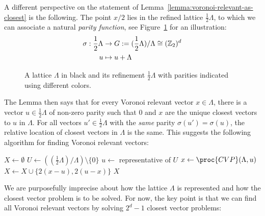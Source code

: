 A different perspective on the statement of Lemma~\ref{lemma:voronoi-relevant-as-closest}
is the following.
The point $x/2$ lies in the refined lattice $\frac{1}{2} \Lambda$,
to which we can associate a natural \emph{parity function},
see Figure~\ref{fig:lattice-refinement-parity} for an illustration:
\begin{align*}
  \sigma : \frac{1}{2} \Lambda &\to G := (\frac{1}{2} \Lambda) / \Lambda \cong (\mathbb{Z}_2)^d \\
                   u &\mapsto u + \Lambda
\end{align*}%
\begin{figure}
  \begin{center}
  \end{center}
  \caption{A lattice $\Lambda$ in black and its refinement $\frac{1}{2} \Lambda$
    with parities indicated using different colors.}
  \label{fig:lattice-refinement-parity}
\end{figure}%
The Lemma then says that for every Voronoi relevant vector $x \in \Lambda$,
there is a vector $u \in \frac{1}{2} \Lambda$ of non-zero parity
such that $0$ and $x$ are the unique closest vectors to $u$ in $\Lambda$.
For all vectors $u' \in \frac{1}{2} \Lambda$ with the \emph{same} parity $\sigma(u') = \sigma(u)$,
the relative location of closest vectors in $\Lambda$ is the same.
This suggests the following algorithm for finding Voronoi relevant vectors:
\begin{codebox}
  \li $X \gets \emptyset$
  \li \For $U \gets \left((\frac{1}{2} \Lambda) / \Lambda\right) \setminus \{ 0 \}$
  \li \Do $u \gets$ representative of $U$
  \li     $x \gets \proc{CVP}(\Lambda, u)$
  \li     $X \gets X \cup \{ 2(x - u), 2(u - x) \}$
      \End
  \li \Return $X$
\end{codebox}
We are purposefully imprecise about how the lattice $\Lambda$ is represented
and how the closest vector problem is to be solved.
For now, the key point is that we can find all Voronoi relevant vectors
by solving $2^d - 1$ closest vector problems:

